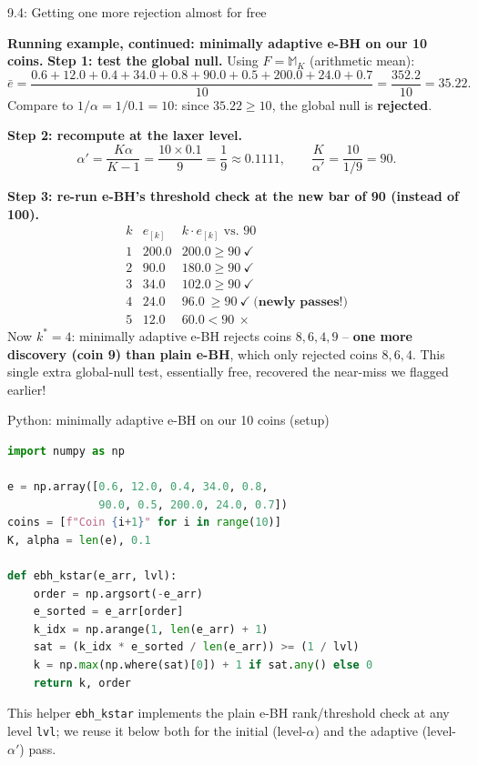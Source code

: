 \documentclass[aspectratio=169,10pt]{beamer}
\begin{document}
\begin{frame}[allowframebreaks]{9.4: Getting one more rejection almost for free}
\framebreak

\textbf{Running example, continued: minimally adaptive e-BH on our 10 coins.}
\textbf{Step 1: test the global null.} Using $F=\mathbb{M}_K$ (arithmetic mean):
\[
\bar e = \frac{0.6+12.0+0.4+34.0+0.8+90.0+0.5+200.0+24.0+0.7}{10} = \frac{352.2}{10} = 35.22.
\]
Compare to $1/\alpha = 1/0.1 = 10$: since $35.22 \ge 10$, the global null is \textbf{rejected}.

\textbf{Step 2: recompute at the laxer level.}
\[
\alpha' = \frac{K\alpha}{K-1} = \frac{10 \times 0.1}{9} = \frac{1}{9} \approx 0.1111, \qquad \frac{K}{\alpha'} = \frac{10}{1/9} = 90.
\]

\framebreak

\textbf{Step 3: re-run e-BH's threshold check at the new bar of 90 (instead of 100).}
\[
\begin{array}{c|c|c}
k & e_{[k]} & k\cdot e_{[k]} \text{ vs. } 90\\
\hline
1 & 200.0 & 200.0 \ge 90 \ \checkmark\\
2 & 90.0 & 180.0 \ge 90 \ \checkmark\\
3 & 34.0 & 102.0 \ge 90 \ \checkmark\\
4 & 24.0 & 96.0 \ \ge 90 \ \checkmark \ \textbf{(newly passes!)}\\
5 & 12.0 & 60.0 < 90 \ \times
\end{array}
\]
Now $k^\ast = 4$: minimally adaptive e-BH rejects coins $8,6,4,9$ -- \textbf{one more discovery (coin 9) than plain e-BH}, which only rejected coins $8,6,4$. This single extra global-null test, essentially free, recovered the near-miss we flagged earlier!

\end{frame}

\begin{frame}[fragile]{Python: minimally adaptive e-BH on our 10 coins (setup)}
\begin{lstlisting}[language=Python]
import numpy as np

e = np.array([0.6, 12.0, 0.4, 34.0, 0.8,
              90.0, 0.5, 200.0, 24.0, 0.7])
coins = [f"Coin {i+1}" for i in range(10)]
K, alpha = len(e), 0.1

def ebh_kstar(e_arr, lvl):
    order = np.argsort(-e_arr)
    e_sorted = e_arr[order]
    k_idx = np.arange(1, len(e_arr) + 1)
    sat = (k_idx * e_sorted / len(e_arr)) >= (1 / lvl)
    k = np.max(np.where(sat)[0]) + 1 if sat.any() else 0
    return k, order
\end{lstlisting}
This helper \texttt{ebh\_kstar} implements the plain e-BH rank/threshold check at any level \texttt{lvl}; we reuse it below both for the initial (level-$\alpha$) and the adaptive (level-$\alpha'$) pass.
\end{frame}
\end{document}
